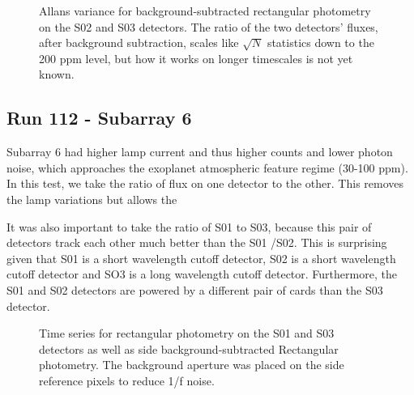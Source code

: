 \documentclass{aastex62}
\begin{document}
\begin{figure}
\caption{Allans variance for background-subtracted rectangular photometry on the S02 and S03 detectors.
The ratio of the two detectors' fluxes, after background subtraction, scales like $\sqrt{N}$ statistics down to the 200 ppm level, but how it works on longer timescales is not yet known.}\label{fig:GLAllanVarianceAcrossDetectors}
\end{figure}

\subsection{Run 112 - Subarray 6}
Subarray 6 had higher lamp current and thus higher counts and lower photon noise, which approaches the exoplanet atmospheric feature regime (30-100 ppm).
In this test, we take the ratio of flux on one detector to the other.
This removes the lamp variations but allows the 


It was also important to take the ratio of S01 to S03, because this pair of detectors track each other much better than the S01 /S02.
This is surprising given that S01 is a short wavelength cutoff detector, S02 is a short wavelength cutoff detector and SO3 is a long wavelength cutoff detector.
Furthermore, the S01 and S02 detectors are powered by a different pair of cards than the S03 detector.


\begin{figure}
\caption{Time series for rectangular photometry on the S01 and S03 detectors as well as side background-subtracted Rectangular photometry.
The background aperture was placed on the side reference pixels to reduce 1/f noise.}\label{fig:GLtSeriesRun112sub6}
\end{figure}
\end{document}
